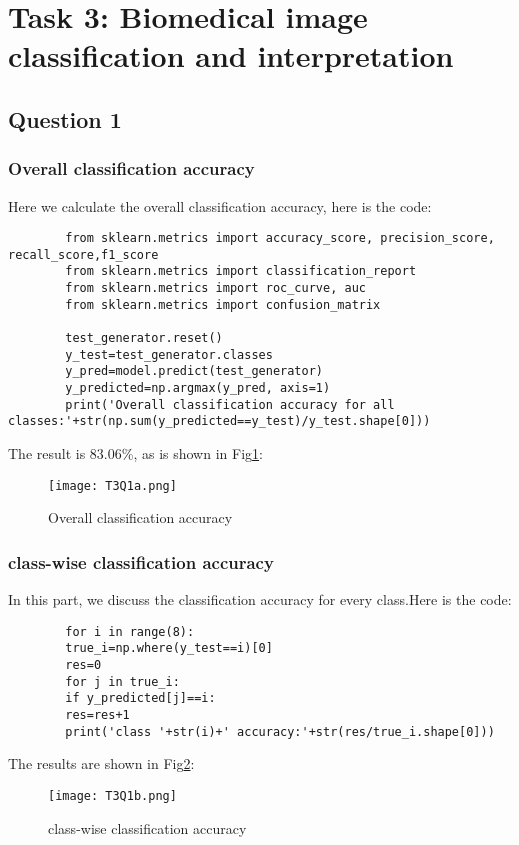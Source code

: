 \documentclass[conference]{IEEEtran}
\begin{document}
	\section{Task 3: Biomedical image classification and interpretation}
	\subsection{Question 1}
	\subsubsection{Overall classification accuracy}
	Here we calculate the overall classification accuracy, here is the code:
	\begin{lstlisting}
		from sklearn.metrics import accuracy_score, precision_score, recall_score,f1_score
		from sklearn.metrics import classification_report
		from sklearn.metrics import roc_curve, auc
		from sklearn.metrics import confusion_matrix
		
		test_generator.reset()
		y_test=test_generator.classes
		y_pred=model.predict(test_generator)
		y_predicted=np.argmax(y_pred, axis=1)
		print('Overall classification accuracy for all classes:'+str(np.sum(y_predicted==y_test)/y_test.shape[0]))
	\end{lstlisting}
	The result is 83.06\%, as is shown in Fig\ref{Fig.t3q1}:
	\begin{figure}[h] 
		\centering
		\texttt{[image: T3Q1a.png]}
		\caption{Overall classification accuracy}
		\label{Fig.t3q1}
	\end{figure}
	\subsubsection{class-wise classification accuracy}
	In this part, we discuss the classification accuracy for every class.Here is the code:
	\begin{lstlisting}
		for i in range(8):
		true_i=np.where(y_test==i)[0]
		res=0
		for j in true_i:
		if y_predicted[j]==i:
		res=res+1
		print('class '+str(i)+' accuracy:'+str(res/true_i.shape[0]))
	\end{lstlisting}
	The results are shown in Fig\ref{Fig.t3q2}:
	\begin{figure}[h] 
		\centering
		\texttt{[image: T3Q1b.png]}
		\caption{class-wise classification accuracy} 
		\label{Fig.t3q2} 
	\end{figure}
\end{document}
